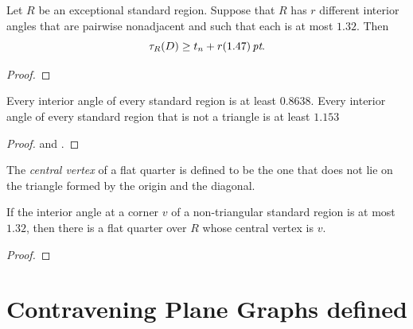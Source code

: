 %

\begin{lemma}\label{lemma:1.47}
Let $R$ be an exceptional standard region.  Suppose that $R$ has $r$
different interior angles that are pairwise nonadjacent and such
that each is at most $1.32$.  Then
    $$\tau_R(D) \ge t_n + r (1.47)\,\hbox{\it pt}.$$
\end{lemma}

\begin{proof} 
\end{proof}

\begin{lemma} \label{lemma:0.8638}
Every interior angle of every standard region is at least
$0.8638$. Every interior angle of every standard region that is
not a triangle is at least $1.153$
\end{lemma}

\begin{proof}   and .
\end{proof}

\begin{definition}
The {\it central vertex\/} of a flat quarter is defined to be the
one that does not lie on the triangle formed by the origin and the
diagonal.
%
\end{definition}

\begin{lemma}\label{lemma:1.32:bis}
If the interior angle at a corner $v$ of a non-triangular standard
region is at most $1.32$, then there is a flat quarter over $R$
whose central vertex is $v$.
\end{lemma}

\begin{proof} 
\end{proof}



\section{Contravening Plane Graphs defined}
\label{sec:stargraph}

